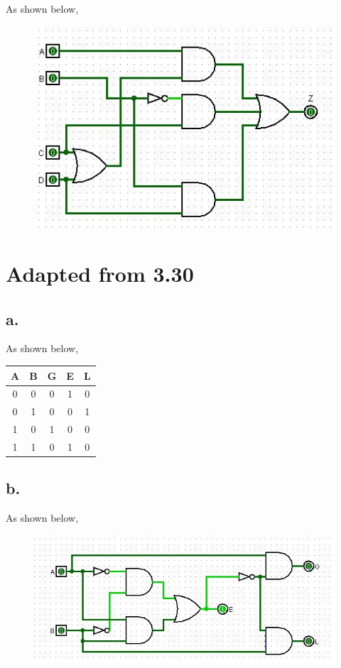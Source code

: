 \documentclass[11pt,a4paper]{article}
\begin{document}
	\section{}
	As shown below,
	\begin{figure}[H]
		\centering
		\includegraphics[width=1\linewidth]{7.jpg}
		\label{7}
	\end{figure}
	
	\section{Adapted from 3.30}
	\subsection*{a.}
	As shown below,\par
	\begin{tabular}{cc|ccc}
		\hline 
		A & B & G & E & L \\ 
		\hline 
		0 & 0 & 0 & 1 & 0 \\ 
		\hline 
		0 & 1 & 0 & 0 & 1 \\ 
		\hline 
		1 & 0 & 1 & 0 & 0 \\ 
		\hline 
		1 & 1 & 0 & 1 & 0 \\ 
		\hline 
	\end{tabular} 
	\subsection*{b.}
	As shown below,\par
	\begin{figure}[H]
		\centering
		\includegraphics[width=1\linewidth]{8_b.jpg}
		\label{8_b}
	\end{figure}
\end{document}
